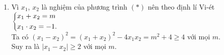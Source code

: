 \begin{bt}
{\begin{enumerate}
\begin{itemize}
			\end{itemize}
			Vì $x_1$, $x_2$ là nghiệm của phương trình $(*)$ nên theo định lí Vi-ét ta có $k_1\cdot k_2 = x_1\cdot x_2 = -1$, do đó $OM\perp ON$ hay $\triangle OMN$ vuông tại gốc tọa độ $O$. \hfill $(3)$\\
			Từ $(1)$, $(2)$, $(3)$ suy ra điều phải chứng minh.
			\item
			Vì $x_1$, $x_2$ là nghiệm của phương trình $(*)$ nên theo định lí Vi-ét  $\left\{\begin{aligned}&x_1+x_2=m\\&x_1\cdot x_2 = -1.\end{aligned}\right.$\\
			Ta có $\left(x_1 - x_2\right)^2 = (x_1+x_2)^2-4x_1 x_2 = m^2 +4\geq 4$ với mọi $m$.\\
			Suy ra là $\left|x_1-x_2\right |\geq 2$ với mọi $m$.
		\end{enumerate}
	}
\end{bt}
